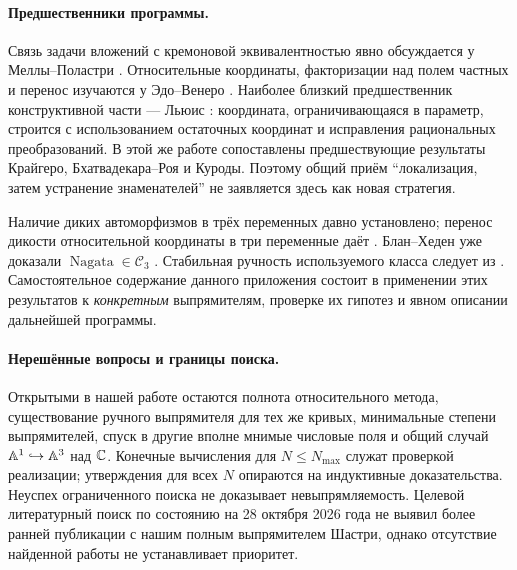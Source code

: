 \paragraph{Предшественники программы.}
Связь задачи вложений с кремоновой эквивалентностью явно обсуждается
у Меллы--Поластри \cite[введение и Theorem~1]{MP2009}.
Относительные координаты, факторизации над полем частных и перенос
изучаются у Эдо--Венеро \cite{EV2001}.
Наиболее близкий предшественник конструктивной части --- Льюис
\cite[Lemma~1, Theorems~2 и~12]{Lewis2024}: координата, ограничивающаяся
в параметр, строится с использованием остаточных координат и
исправления рациональных преобразований. В этой же работе сопоставлены
предшествующие результаты Крайгеро, Бхатвадекара--Роя и Куроды.
Поэтому общий приём ``локализация, затем устранение знаменателей''
не заявляется здесь как новая стратегия.

Наличие диких автоморфизмов в трёх переменных давно установлено;
перенос дикости относительной координаты в три переменные даёт
\cite{UY2004}. Блан--Хеден уже доказали
$\operatorname{Nagata}\in\mathcal C_3$
\cite[Proposition~6.8]{BH2015}. Стабильная ручность используемого
класса следует из \cite[Corollary~4.9]{BEW2012}.
Самостоятельное содержание данного приложения состоит в применении
этих результатов к \emph{конкретным} выпрямителям, проверке их
гипотез и явном описании дальнейшей программы.

\paragraph{Нерешённые вопросы и границы поиска.}
Открытыми в нашей работе остаются полнота относительного метода,
существование ручного выпрямителя для тех же кривых, минимальные степени
выпрямителей, спуск в другие вполне мнимые числовые поля и общий случай
${\mathbb A}^1\hookrightarrow{\mathbb A}^3$ над ${\mathbb C}$.
Конечные вычисления для $N\leq N_{\max}$ служат проверкой реализации;
утверждения для всех $N$ опираются на индуктивные доказательства.
Неуспех ограниченного поиска не доказывает невыпрямляемость.
Целевой литературный поиск по состоянию на 28 октября 2026 года не
выявил более ранней публикации с нашим полным выпрямителем Шастри,
однако отсутствие найденной работы не устанавливает приоритет.
